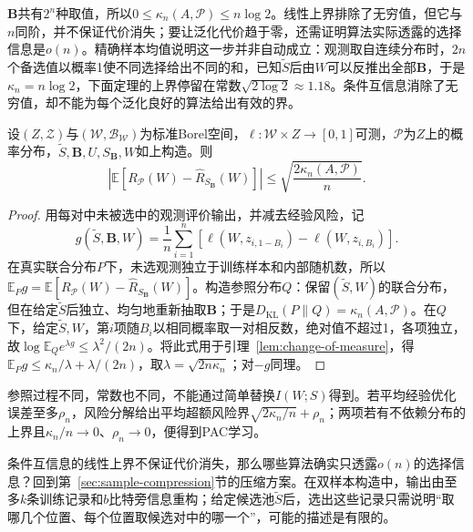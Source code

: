 $\bm B$共有$2^n$种取值，所以$0\leq\kappa_n(A,\mathcal P)\leq n\log2$。线性上界排除了无穷值，但它与$n$同阶，并不保证代价消失；要让泛化代价趋于零，还需证明算法实际透露的选择信息是$o(n)$。精确样本均值说明这一步并非自动成立：观测取自连续分布时，$2n$个备选值以概率1使不同选择给出不同的和，已知$\tilde S$后由$W$可以反推出全部$\bm B$，于是$\kappa_n=n\log2$，下面定理的上界停留在常数$\sqrt{2\log2}\approx1.18$。条件互信息消除了无穷值，却不能为每个泛化良好的算法给出有效的界。

\begin{theorem}[条件互信息与期望风险]
\label{thm:conditional-information-risk}
设$(Z,\mathcal Z)$与$(\mathcal W,\mathcal B_{\mathcal W})$为标准Borel空间，$\ell:\mathcal W\times Z\to[0,1]$可测，$\mathcal P$为$Z$上的概率分布，$\tilde S,\bm B,U,S_{\bm B},W$如上构造。则
\[
 \left|\mathbb E[R_{\mathcal P}(W)-\hat R_{S_{\bm B}}(W)]\right|\leq\sqrt{\frac{2\kappa_n(A,\mathcal P)}n}.
\]
\end{theorem}
\begin{proof}
用每对中未被选中的观测评价输出，并减去经验风险，记
\[
 g(\tilde S,\bm B,W)=\frac1n\sum_{i=1}^n[\ell(W,z_{i,1-B_i})-\ell(W,z_{i,B_i})].
\]
在真实联合分布$P$下，未选观测独立于训练样本和内部随机数，所以$\mathbb E_Pg=\mathbb E[R_{\mathcal P}(W)-\hat R_{S_{\bm B}}(W)]$。构造参照分布$Q$：保留$(\tilde S,W)$的联合分布，但在给定$\tilde S$后独立、均匀地重新抽取$\bm B$；于是$D_{\mathrm{KL}}(P\|Q)=\kappa_n(A,\mathcal P)$。在$Q$下，给定$\tilde S,W$，第$i$项随$B_i$以相同概率取一对相反数，绝对值不超过1，各项独立，故$\log\mathbb E_Qe^{\lambda g}\leq\lambda^2/(2n)$。将此式用于引理~\ref{lem:change-of-measure}，得$\mathbb E_Pg\leq\kappa_n/\lambda+\lambda/(2n)$，取$\lambda=\sqrt{2n\kappa_n}$；对$-g$同理。
\end{proof}

参照过程不同，常数也不同，不能通过简单替换$I(W;S)$得到。若平均经验优化误差至多$\rho_n$，风险分解给出平均超额风险界$\sqrt{2\kappa_n/n}+\rho_n$；两项若有不依赖分布的上界且$\kappa_n/n\to0$、$\rho_n\to0$，便得到PAC学习。

条件互信息的线性上界不保证代价消失，那么哪些算法确实只透露$o(n)$的选择信息？回到第~\ref{sec:sample-compression}节的压缩方案。在双样本构造中，输出由至多$k$条训练记录和$b$比特旁信息重构；给定候选池$\tilde S$后，选出这些记录只需说明“取哪几个位置、每个位置取候选对中的哪一个”，可能的描述是有限的。

